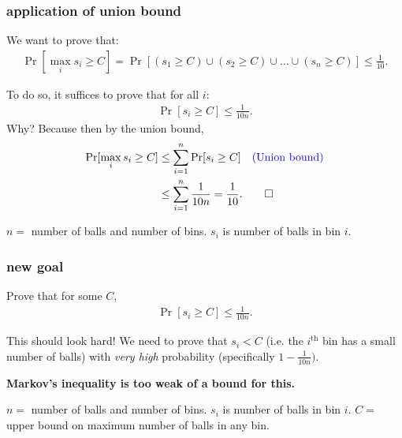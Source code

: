 \documentclass[compress]{beamer}
\newcommand{\blue}[1]{\textcolor{blue}{#1}}
\begin{document}
\begin{frame}
	\frametitle{application of union bound}
	We want to prove that:
	\begin{align*}
		\Pr[\max_i s_i \geq C] = \Pr[(s_1 \geq C) \cup (s_2 \geq C) \cup \ldots \cup (s_n \geq C)] \leq \frac{1}{10}. 
	\end{align*}
	
	\alert{To do so, it suffices to prove that for all $i$:
		\begin{align*}
			\Pr[s_i \geq C] \leq \frac{1}{10n}. 
	\end{align*}}
	Why? Because then by the union bound, 
	\begin{align*}
		\Pr[\max_i s_i \geq C] &\leq \sum_{i=1}^n \Pr[s_i \geq C] \text{\hspace{1em}\blue{(Union bound)}}\\
		&\leq \sum_{i=1}^n \frac{1}{10n} = \frac{1}{10}. \qed
	\end{align*}
	

	\begin{block}{\vspace*{-3ex}}
		\small $n = $ number of balls and number of bins. $s_i$ is number of balls in bin $i$.
	\end{block}
\end{frame}

\begin{frame}
	\frametitle{new goal}
	Prove that for some $C$, 
	\begin{align*}
		\Pr[s_i \geq C] \leq \frac{1}{10n}. 
	\end{align*}
	
	\begin{center}
		This should look hard! We need to prove that $s_i < C$ (i.e. the $i^\text{th}$ bin has a small number of balls) with \emph{very high} probability (specifically $1- \frac{1}{10n})$. 
		
		\alert{\textbf{Markov's inequality is too weak of a bound for this.}}
	\end{center}
	
	\vspace{2em}
	\begin{block}{\vspace*{-3ex}}
		\small $n = $ number of balls and number of bins. $s_i$ is number of balls in bin $i$. $C =$ upper bound on maximum number of balls in any bin.
	\end{block}
\end{frame}
\end{document}
